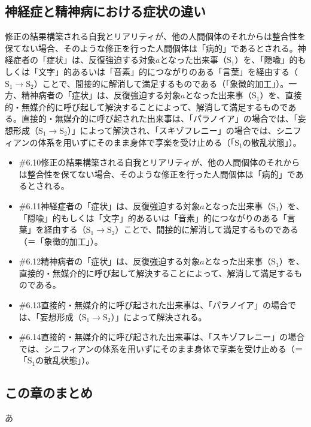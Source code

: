 \subsection{神経症と精神病における症状の違い}\label{ux795eux7d4cux75c7ux3068ux7cbeux795eux75c5ux306bux304aux3051ux308bux75c7ux72b6ux306eux9055ux3044}

修正の結果構築される自我とリアリティが、他の人間個体のそれからは整合性を保てない場合、そのような修正を行った人間個体は「病的」であるとされる。神経症者の「症状」は、反復強迫する対象\(a\)となった出来事（\(\textrm{S}_1\)）を、「隠喩」的もしくは「文字」的あるいは「音素」的につながりのある「言葉」を経由する（\(\textrm{S}_1\rightarrow\textrm{S}_2\)）ことで、間接的に解消して満足するものである（「象徴的加工」）。一方、精神病者の「症状」は、反復強迫する対象\(a\)となった出来事（\(\textrm{S}_1\)）を、直接的・無媒介的に呼び起して解決することによって、解消して満足するものである。直接的・無媒介的に呼び起された出来事は、「パラノイア」の場合では、「妄想形成（\(\textrm{S}_1\rightarrow\textrm{S}_2\)）」によって解決され、「スキゾフレニー」の場合では、シニフィアンの体系を用いずにそのまま身体で享楽を受け止める（「\(\textrm{S}_1\)の散乱状態」）。

\begin{note}{}
  \begin{itemize}
    \tightlist
    \item{\#6.10}修正の結果構築される自我とリアリティが、他の人間個体のそれからは整合性を保てない場合、そのような修正を行った人間個体は「病的」であるとされる。
    \item{\#6.11}神経症者の「症状」は、反復強迫する対象$a$となった出来事（$\textrm{S}_1$）を、「隠喩」的もしくは「文字」的あるいは「音素」的につながりのある「言葉」を経由する（$\textrm{S}_1\rightarrow\textrm{S}_2$）ことで、間接的に解消して満足するものである（＝「象徴的加工」）。
    \item{\#6.12}精神病者の「症状」は、反復強迫する対象$a$となった出来事（$\textrm{S}_1$）を、直接的・無媒介的に呼び起して解決することによって、解消して満足するものである。
    \item{\#6.13}直接的・無媒介的に呼び起された出来事は、「パラノイア」の場合では、「妄想形成（$\textrm{S}_1\rightarrow\textrm{S}_2$）」によって解決される。
    \item{\#6.14}直接的・無媒介的に呼び起された出来事は、「スキゾフレニー」の場合では、シニフィアンの体系を用いずにそのまま身体で享楽を受け止める（＝「$\textrm{S}_1$の散乱状態」）。
  \end{itemize}
\end{note}

\subsection{この章のまとめ}\label{ux3053ux306eux7ae0ux306eux307eux3068ux3081}

あ
